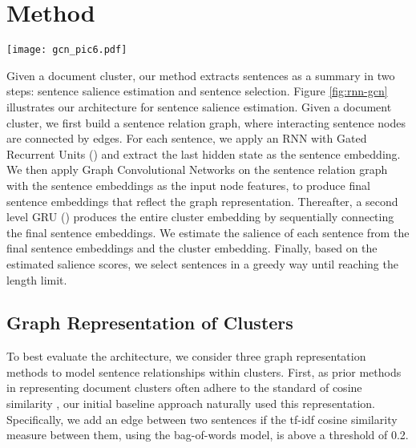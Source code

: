 \documentclass[11pt,a4paper]{article}
\begin{document}
\section{Method}
\begin{figure*}[t]
\hspace{-2mm}\texttt{[image: gcn\_pic6.pdf]}
  \caption{Illustration of our architecture for sentence salience estimation.
  In this example, there are two documents in the cluster and each document has two sentences.
  Sentences are processed by the  to get input sentence embeddings.
  The GCN takes the input sentence embeddings and the sentence relation graph, and outputs high-level hidden features for individual sentences.
   produces the cluster embedding from the output sentence embeddings.
  The salience is estimated from the output sentence embeddings and the cluster embedding.
  : the word embedding for -th word.
  : the hidden state of  at -th step.
  }
  \label{fig:rnn-gcn}
  \vspace{-5mm}
\end{figure*}
Given a document cluster, our method extracts sentences as a summary in two steps: sentence salience estimation and sentence selection.
Figure \ref{fig:rnn-gcn} illustrates our architecture for sentence salience estimation.
Given a document cluster, we first build a sentence relation graph, where interacting sentence nodes are connected by edges. 
For each sentence, we apply an RNN with Gated Recurrent Units () \cite{cho-EtAl:2014:EMNLP2014,chung2014empirical} and extract the last hidden state as the sentence embedding.
We then apply Graph Convolutional Networks \cite{kipf2017semi} on the sentence relation graph with the sentence embeddings as the input node features, to produce final sentence embeddings that reflect the graph representation.
Thereafter, a second level GRU () produces the entire cluster embedding by sequentially connecting the final sentence embeddings.
We estimate the salience of each sentence from the final sentence embeddings and the cluster embedding.
Finally, based on the estimated salience scores, we select sentences in a greedy way until reaching the length limit.

\subsection{Graph Representation of Clusters}

To best evaluate the architecture, we consider three graph representation methods to model sentence relationships within clusters.
First, as prior methods in representing document clusters often adhere to the standard of cosine similarity \cite{erkan2004lexrank}, our initial baseline approach naturally used this representation. Specifically, we add an edge between two sentences if the tf-idf cosine similarity measure between them, using the bag-of-words model,
is above a threshold of 0.2.
\end{document}
